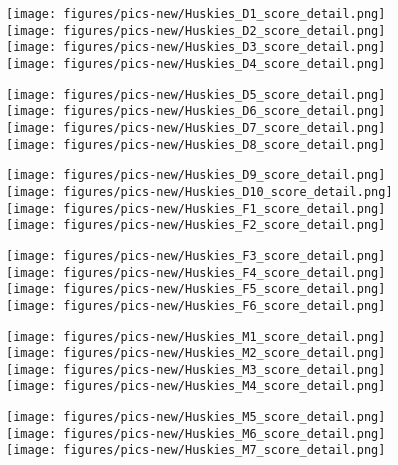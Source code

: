 \documentclass{mcmthesis}
\begin{document}
\begin{appendices}
\begin{figure}[h]\centering
\texttt{[image: figures/pics-new/Huskies\_D1\_score\_detail.png]}
\texttt{[image: figures/pics-new/Huskies\_D2\_score\_detail.png]}
\texttt{[image: figures/pics-new/Huskies\_D3\_score\_detail.png]}
\texttt{[image: figures/pics-new/Huskies\_D4\_score\_detail.png]}
\end{figure}
\begin{figure}[h]\centering
\texttt{[image: figures/pics-new/Huskies\_D5\_score\_detail.png]}
\texttt{[image: figures/pics-new/Huskies\_D6\_score\_detail.png]}
\texttt{[image: figures/pics-new/Huskies\_D7\_score\_detail.png]}
\texttt{[image: figures/pics-new/Huskies\_D8\_score\_detail.png]}
\end{figure}
\begin{figure}[h]\centering
\texttt{[image: figures/pics-new/Huskies\_D9\_score\_detail.png]}
\texttt{[image: figures/pics-new/Huskies\_D10\_score\_detail.png]}
\texttt{[image: figures/pics-new/Huskies\_F1\_score\_detail.png]}
\texttt{[image: figures/pics-new/Huskies\_F2\_score\_detail.png]}
\end{figure}
\begin{figure}[h]\centering
\texttt{[image: figures/pics-new/Huskies\_F3\_score\_detail.png]}
\texttt{[image: figures/pics-new/Huskies\_F4\_score\_detail.png]}
\texttt{[image: figures/pics-new/Huskies\_F5\_score\_detail.png]}
\texttt{[image: figures/pics-new/Huskies\_F6\_score\_detail.png]}
\end{figure}
\begin{figure}[h]\centering
\texttt{[image: figures/pics-new/Huskies\_M1\_score\_detail.png]}
\texttt{[image: figures/pics-new/Huskies\_M2\_score\_detail.png]}
\texttt{[image: figures/pics-new/Huskies\_M3\_score\_detail.png]}
\texttt{[image: figures/pics-new/Huskies\_M4\_score\_detail.png]}
\end{figure}
\begin{figure}[h]\centering
\texttt{[image: figures/pics-new/Huskies\_M5\_score\_detail.png]}
\texttt{[image: figures/pics-new/Huskies\_M6\_score\_detail.png]}
\texttt{[image: figures/pics-new/Huskies\_M7\_score\_detail.png]}

\end{figure}
\end{appendices}
\end{document}
